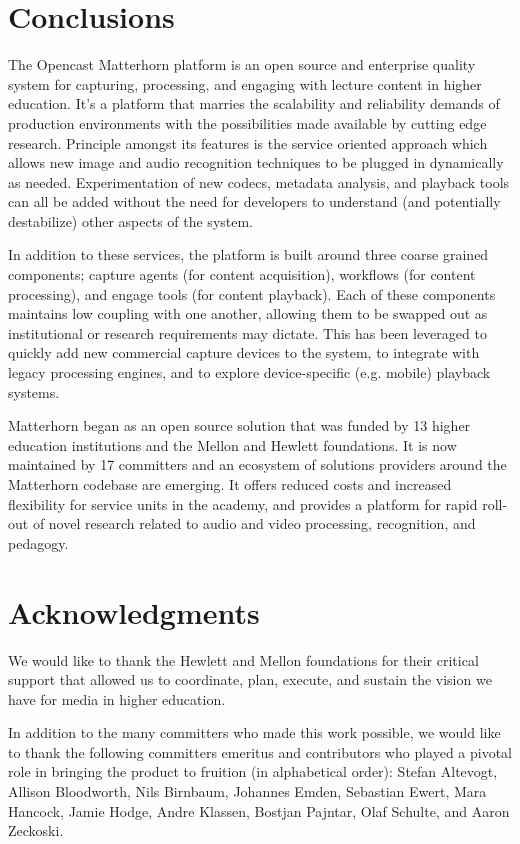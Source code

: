 \documentclass{sig-alternate}
\begin{document}
\section{Conclusions}
The Opencast Matterhorn platform is an open source and enterprise quality system for capturing, processing, and engaging with lecture content in higher education.  It's a platform that marries the scalability and reliability demands of production environments with the possibilities made available by cutting edge research.  Principle amongst its features is the service oriented approach which allows new image and audio recognition techniques to be plugged in dynamically as needed.  Experimentation of new codecs, metadata analysis, and playback tools can all be added without the need for developers to understand (and potentially destabilize) other aspects of the system.

In addition to these services, the platform is built around three coarse grained components; capture agents (for content acquisition), workflows (for content processing), and engage tools (for content playback).  Each of these components maintains low coupling with one another, allowing them to be swapped out as institutional or research requirements may dictate.  This has been leveraged to quickly add new commercial capture devices to the system, to integrate with legacy processing engines, and to explore device-specific (e.g. mobile) playback systems.

Matterhorn began as an open source solution that was funded by 13 higher education institutions and the Mellon and Hewlett foundations.  It is now maintained by 17 committers and an ecosystem of solutions providers around the Matterhorn codebase are emerging.  It offers reduced costs and increased flexibility for service units in the academy, and provides a platform for rapid roll-out of novel research related to audio and video processing, recognition, and pedagogy.

\section{Acknowledgments}
We would like to thank the Hewlett and Mellon foundations for their critical support that allowed us to coordinate, plan, execute, and sustain the vision we have for media in higher education.

In addition to the many committers who made this work possible, we would like to thank the following committers emeritus and contributors who played a pivotal role in bringing the product to fruition (in alphabetical order): Stefan Altevogt, Allison Bloodworth, Nils Birnbaum, Johannes Emden, Sebastian Ewert, Mara Hancock, Jamie Hodge, Andre Klassen, Bostjan Pajntar, Olaf Schulte, and Aaron Zeckoski.
\end{document}
